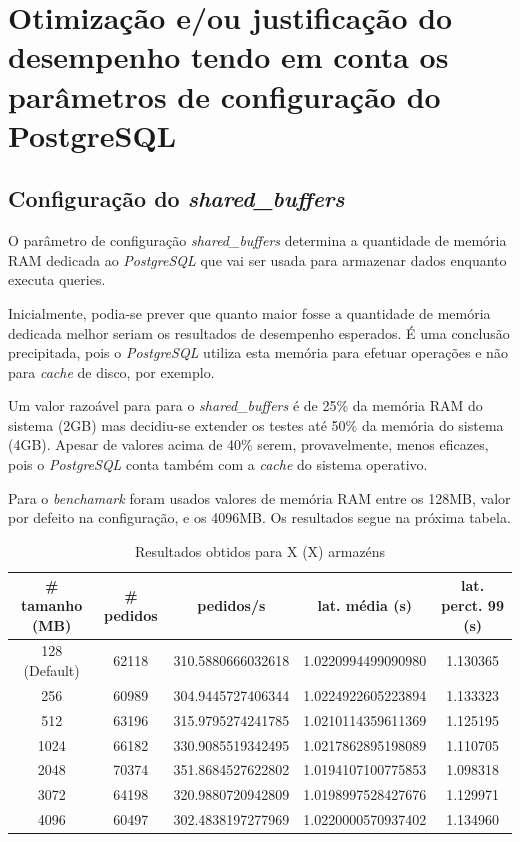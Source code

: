 \section{Otimização e/ou justificação do desempenho tendo em conta os parâmetros de configuração do PostgreSQL}

\subsection{Configuração do \textit{shared\_buffers}}

O parâmetro de configuração \textit{shared\_buffers} determina a quantidade de memória RAM dedicada ao \textit{PostgreSQL} que vai ser usada para armazenar dados enquanto executa queries.

Inicialmente, podia-se prever que quanto maior fosse a quantidade de memória dedicada melhor seriam os resultados de desempenho esperados. É uma conclusão precipitada, pois o \textit{PostgreSQL} utiliza esta memória para efetuar operações e não para \textit{cache} de disco, por exemplo.

Um valor razoável para para o \textit{shared\_buffers} é de 25\% da memória RAM do sistema (2GB) mas decidiu-se extender os testes até 50\% da memória do sistema (4GB). Apesar de valores acima de 40\% serem, provavelmente, menos eficazes, pois o \textit{PostgreSQL} conta também com a \textit{cache} do sistema operativo.

Para o \textit{benchamark} foram usados valores de memória RAM entre os 128MB, valor por defeito na configuração, e os 4096MB. Os resultados segue na próxima tabela.

\begin{table}[!h]
\center
\small
\begin{tabular}{|c|c|c|c|c|}
\hline
\textbf{\# tamanho (MB)} & \textbf{\# pedidos} & \textbf{pedidos/s} & \textbf{lat. média (s)} & \textbf{lat. perct. 99 (s)}  \\ \hline
128 (Default) & 62118 & 310.5880666032618 & 1.0220994499090980 & 1.130365  \\ \hline
256 & 60989 & 304.9445727406344 & 1.0224922605223894 & 1.133323  \\ \hline
512 & 63196 & 315.9795274241785 & 1.0210114359611369 & 1.125195  \\ \hline
1024 & 66182 & 330.9085519342495 & 1.0217862895198089 & 1.110705  \\ \hline
2048 & 70374 & 351.8684527622802 & 1.0194107100775853 & 1.098318  \\ \hline
3072 & 64198 & 320.9880720942809 & 1.0198997528427676 & 1.129971  \\ \hline
4096 & 60497 & 302.4838197277969 & 1.0220000570937402 & 1.134960  \\ \hline
\end{tabular}
\caption{Resultados obtidos para X (X) armazéns}
\end{table}

